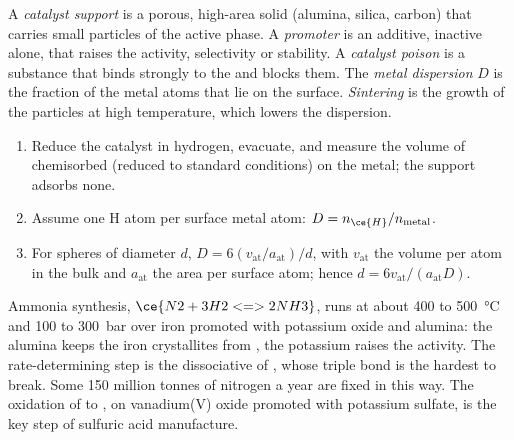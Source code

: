 \begin{definition}\label{def:b3:surfaces-catalysis:catalyst-design}
A \emph{catalyst support} is a porous, high-area solid
(alumina, silica, carbon) that carries small particles of the active phase. A
\emph{promoter} is an additive, inactive alone, that raises the
activity, selectivity or stability. A \emph{catalyst poison}
is a substance that binds strongly to the  and blocks them.
The \emph{metal dispersion} $D$ is the fraction of the metal
atoms that lie on the surface. \emph{Sintering} is the growth of
the particles at high temperature, which lowers the dispersion.
\end{definition}

\begin{method}\label{met:b3:surfaces-catalysis:dispersion}
\begin{enumerate}
  \item Reduce the catalyst in hydrogen, evacuate, and measure the volume of 
        chemisorbed (reduced to standard conditions) on the metal; the
        support adsorbs none.
  \item Assume one H atom per surface metal atom: $D = n_{\ce{H}}/n_{\text{metal}}$.
  \item For spheres of diameter $d$, $D = 6(v_{\mathrm{at}}/a_{\mathrm{at}})/d$, with $v_{\mathrm{at}}$ the volume per atom in the
        bulk and $a_{\mathrm{at}}$ the area per surface atom; hence $d = 6v_{\mathrm{at}}/(a_{\mathrm{at}}D)$.
\end{enumerate}
\end{method}

Ammonia synthesis, $\ce{N2 + 3 H2 <=> 2 NH3}$, runs at about 400 to \qty{500}{\celsius} and 100 to
\qty{300}{bar} over iron promoted with potassium oxide and alumina: the alumina keeps
the iron crystallites from , the potassium raises the activity. The
rate-determining step is the dissociative  of , whose triple
bond is the hardest to break. Some 150 million tonnes of nitrogen a year are
fixed in this way.
The oxidation of  to , on vanadium(V) oxide promoted
with potassium sulfate, is the key step of sulfuric acid manufacture.

